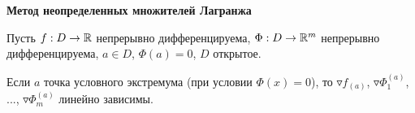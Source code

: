 \documentclass[10pt, oneside, dvipsnames]{extarticle}
\begin{document}
\begin{theorem}
    \textbf{Метод неопределенных множителей Лагранжа}
    
    Пусть $f: D \rightarrow \mathbb{R}$ непрерывно дифференцируема,  $\Phi: D \rightarrow \mathbb{R}^m$ непрерывно дифференцируема, $a\in D$, $\Phi(a) =0$, $D$ открытое. 

    Если $a$ точка условного экстремума (при условии $\Phi(x) = 0$), то $\triangledown f_{(a)}$, $\triangledown \Phi_1^{(a)}$, ..., $\triangledown \Phi_m^{(a)}$ линейно зависимы.
\end{theorem}

\newpage
\end{document}
